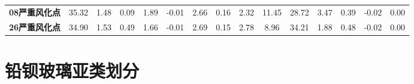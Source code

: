 \documentclass[withoutpreface,bwprint]{cumcmthesis} %
\begin{document}
\begin{appendices}
\begin{table}[!h]
\begin{tabular}{@{}ccccccccccccccc@{}}
			\textbf{08严重风化点} & 35.32                                                          & 1.48                                                          & 0.09                                                         & 1.89                                                         & -0.01                                                        & 2.66                                                           & 0.16                                                           & 2.32                                                         & 11.45                                                        & 28.72                                                        & 3.47                                                            & 0.39                                                         & -0.02                                                         & 0.00                                                          \\
			\textbf{26严重风化点} & 34.90                                                          & 1.53                                                          & 0.49                                                         & 1.66                                                         & -0.01                                                        & 2.69                                                           & 0.15                                                           & 2.78                                                         & 8.96                                                         & 34.21                                                        & 1.88                                                            & 0.48                                                         & -0.02                                                         & 0.00                                                          \\ \bottomrule
		\end{tabular}
	\end{table}

\newpage



\section{铅钡玻璃亚类划分}
\label{qbyl}


\end{appendices}
\end{document}
